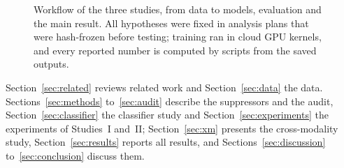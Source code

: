 \begin{figure}[htbp]
\centering
{}
\caption{Workflow of the three studies, from data to models, evaluation and the main result. All hypotheses were fixed in analysis plans that
were hash-frozen before testing; training ran in cloud GPU kernels, and every reported number is computed by scripts from the saved
outputs.}
\label{fig:workflow}
\end{figure}

Section~\ref{sec:related} reviews related work and Section~\ref{sec:data} the data. Sections~\ref{sec:methods} to~\ref{sec:audit}
describe the suppressors and the audit, Section~\ref{sec:classifier} the classifier study and Section~\ref{sec:experiments} the
experiments of Studies~I and~II; Section~\ref{sec:xm} presents the cross-modality study, Section~\ref{sec:results} reports all results,
and Sections~\ref{sec:discussion} to~\ref{sec:conclusion} discuss them.
